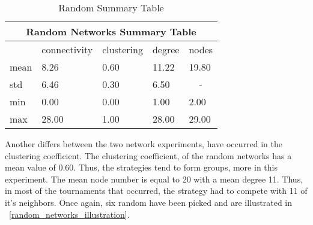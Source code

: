 \begin{table}[!hbtp]
	\centering
	\begin{adjustbox}{width=0.6\textwidth}
		\small
		\begin{tabular}{|l|l|l|l|l|}
			\hline
			\multicolumn{5}{|c|}{Random Networks Summary Table}                       \\ \hline
			     & connectivity & clustering & degree & nodes                  \\ \hline
			mean & 8.26         & 0.60       & 11.22  & 19.80                  \\ \hline
			std  & 6.46         & 0.30       & 6.50   & \multicolumn{1}{c|}{-} \\ \hline
			min  & 0.00         & 0.00       & 1.00   & 2.00                   \\ \hline
			max  & 28.00        & 1.00       & 28.00  & 29.00                  \\ \hline
		\end{tabular}
	\end{adjustbox}
	\caption{Random Summary Table}
	\label{binomial-summary-table}
\end{table}

Another differs between the two network experiments, have occurred in the
clustering coefficient. The clustering coefficient, of the random networks has a
mean value of 0.60. Thus, the strategies tend to form groups, more in this
experiment. The mean node number is equal to 20 with a mean degree 11. Thus, in
most of the tournaments that occurred, the strategy had to compete with 11 of it's
neighbors. Once again, six random have been picked and are illustrated
in ~\ref{random_networks_illustration}.

